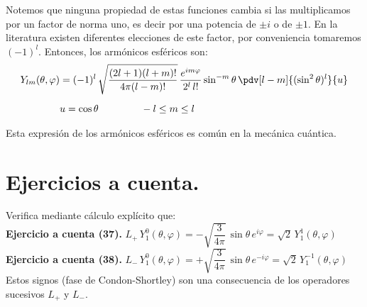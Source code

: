 Notemos que ninguna propiedad de estas funciones cambia si las multiplicamos por un factor de norma uno, es decir por una potencia de $\pm i$ o de $\pm 1$. En la literatura existen diferentes elecciones de este factor, por conveniencia tomaremos $(-1)^{l}$. Entonces, los armónicos esféricos son:
\begin{align}
\begin{aligned}
Y_{lm} (\theta, \varphi) &= (-1)^{l} \, \sqrt{\dfrac{(2 l + 1)(l + m)!}{4 \pi (l -m)!}} \, \dfrac{e^{i m \varphi}}{2^{l} \, l!} \sin^{-m} \theta \, \pdv[l-m]{(\sin^{2} \theta)^{l}}{u} \\[0.5em]
&u = \cos \theta \hspace{1.5cm} -l \leq m \leq l
\end{aligned}
\label{eq:ecuacion_10_175}
\end{align}

Esta expresión de los armónicos esféricos es común en la mecánica cuántica.

\section{Ejercicios a cuenta.}

\noindent
Verifica mediante cálculo explícito que:
\\
\noindent
\textbf{Ejercicio a cuenta (37).}  $L_{+} \, Y_{1}^{0} (\theta, \varphi) = - \sqrt{\dfrac{3}{4 \pi}} \, \sin \theta \, e^{i \varphi} = \sqrt{2} \, Y_{1}^{1} (\theta, \varphi)$ 
\\[1em]
\noindent
\textbf{Ejercicio a cuenta (38).}  $L_{-} \, Y_{1}^{0} (\theta, \varphi) = + \sqrt{\dfrac{3}{4 \pi}} \, \sin \theta \, e^{-i \varphi} = \sqrt{2} \, Y_{1}^{-1} (\theta, \varphi)$ 
\\[1em]
Estos signos (fase de Condon-Shortley) son una consecuencia de los operadores sucesivos $L_{+}$ y $L_{-}$.


